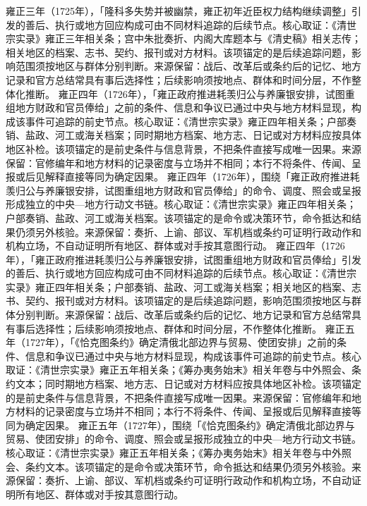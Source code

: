 雍正三年（1725年），「隆科多失势并被幽禁，雍正初年近臣权力结构继续调整」引发的善后、执行或地方回应构成可由不同材料追踪的后续节点。核心取证：《清世宗实录》雍正三年相关条；宫中朱批奏折、内阁大库题本与《清史稿》相关志传；相关地区的档案、志书、契约、报刊或对方材料。该项锚定的是后续追踪问题，影响范围须按地区与群体分别判断。来源保留：战后、改革后或条约后的记忆、地方记录和官方总结常具有事后选择性；后续影响须按地点、群体和时间分层，不作整体化推断。
雍正四年（1726年），「雍正政府推进耗羡归公与养廉银安排，试图重组地方财政和官员俸给」之前的条件、信息和争议已通过中央与地方材料显现，构成该事件可追踪的前史节点。核心取证：《清世宗实录》雍正四年相关条；户部奏销、盐政、河工或海关档案；同时期地方档案、地方志、日记或对方材料应按具体地区补检。该项锚定的是前史条件与信息背景，不把条件直接写成唯一因果。来源保留：官修编年和地方材料的记录密度与立场并不相同；本行不将条件、传闻、呈报或后见解释直接等同为确定因果。
雍正四年（1726年），围绕「雍正政府推进耗羡归公与养廉银安排，试图重组地方财政和官员俸给」的命令、调度、照会或呈报形成独立的中央—地方行动文书链。核心取证：《清世宗实录》雍正四年相关条；户部奏销、盐政、河工或海关档案。该项锚定的是命令或决策环节，命令抵达和结果仍须另外核验。来源保留：奏折、上谕、部议、军机档或条约可证明行政动作和机构立场，不自动证明所有地区、群体或对手按其意图行动。
雍正四年（1726年），「雍正政府推进耗羡归公与养廉银安排，试图重组地方财政和官员俸给」引发的善后、执行或地方回应构成可由不同材料追踪的后续节点。核心取证：《清世宗实录》雍正四年相关条；户部奏销、盐政、河工或海关档案；相关地区的档案、志书、契约、报刊或对方材料。该项锚定的是后续追踪问题，影响范围须按地区与群体分别判断。来源保留：战后、改革后或条约后的记忆、地方记录和官方总结常具有事后选择性；后续影响须按地点、群体和时间分层，不作整体化推断。
雍正五年（1727年），「《恰克图条约》确定清俄北部边界与贸易、使团安排」之前的条件、信息和争议已通过中央与地方材料显现，构成该事件可追踪的前史节点。核心取证：《清世宗实录》雍正五年相关条；《筹办夷务始末》相关年卷与中外照会、条约文本；同时期地方档案、地方志、日记或对方材料应按具体地区补检。该项锚定的是前史条件与信息背景，不把条件直接写成唯一因果。来源保留：官修编年和地方材料的记录密度与立场并不相同；本行不将条件、传闻、呈报或后见解释直接等同为确定因果。
雍正五年（1727年），围绕「《恰克图条约》确定清俄北部边界与贸易、使团安排」的命令、调度、照会或呈报形成独立的中央—地方行动文书链。核心取证：《清世宗实录》雍正五年相关条；《筹办夷务始末》相关年卷与中外照会、条约文本。该项锚定的是命令或决策环节，命令抵达和结果仍须另外核验。来源保留：奏折、上谕、部议、军机档或条约可证明行政动作和机构立场，不自动证明所有地区、群体或对手按其意图行动。
